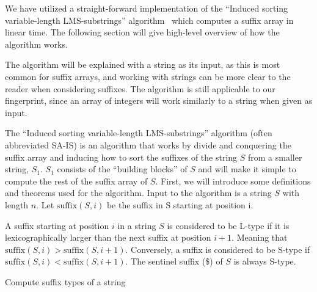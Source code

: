 We have utilized a straight-forward implementation of the ``Induced sorting
variable-length LMS-substrings'' algorithm~\cite{LinearTimeSuffixArraySAIS} which computes
a suffix array in linear time. The following section will give high-level overview of how
the algorithm works. 

The algorithm will be explained with a string as its input, as this is most common for
suffix arrays, and working with strings can be more clear to the reader when considering
suffixes. The algorithm is still applicable to our fingerprint, since an array of integers
will work similarly to a string when given as input.

The ``Induced sorting variable-length LMS-substrings'' algorithm (often abbreviated SA-IS)
is an algorithm that works by divide and conquering the suffix array and inducing how to
sort the suffixes of the string $S$ from a smaller string, $S_1$. $S_1$ consists of the
``building blocks'' of $S$ and will make it simple to compute the rest of the suffix array
of $S$. First, we will introduce some definitions and theorems used for the algorithm.
Input to the algorithm is a string $S$ with length $n$. Let $\mathrm{suffix}(S, i)$ be the
suffix in S starting at position i.

\begin{definition} A suffix starting at position $i$ in a
    string $S$ is considered to be L-type if it is lexicographically larger than the next
    suffix at position $i + 1$. Meaning that $\mathrm{suffix}(S, i) > \mathrm{suffix}(S,
    i+1)$. Conversely, a suffix is considered to be S-type if $\mathrm{suffix}(S, i) <
    \mathrm{suffix}(S, i+1)$. The sentinel suffix (\$) of $S$ is always S-type.
\end{definition}

\begin{algorithm}[htp]
  \SetAlgoLined\DontPrintSemicolon

  \vspace{0.5cm}
  \caption{Compute suffix types of a string}
  \label{alg:suffixtypes}
\end{algorithm}


